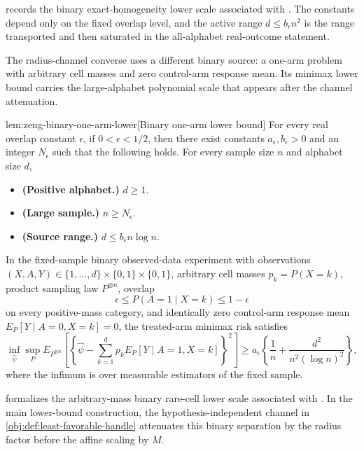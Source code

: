  records the binary exact-homogeneity lower scale associated with \citet{ZengBalakrishnanHanKennedy2024}. The constants depend only on the fixed overlap level, and the active range \(d\le b_\epsilon n^2\) is the range transported and then saturated in the all-alphabet real-outcome statement.

The radius-channel converse uses a different binary source: a one-arm problem with arbitrary cell masses and zero control-arm response mean. Its minimax lower bound carries the large-alphabet polynomial scale that appears after the channel attenuation.

\begin{lemmav}{lem:zeng-binary-one-arm-lower}[Binary one-arm lower bound]
For every real overlap constant \(\epsilon\), if \(0<\epsilon<1/2\), then there exist constants \(a_{\epsilon},b_{\epsilon}>0\) and an integer \(N_{\epsilon}\) such that the following holds.  For every sample size \(n\) and alphabet size \(d\),
\begin{itemize}
\item \textbf{(Positive alphabet.)} \(d\ge 1\).
\item \textbf{(Large sample.)} \(n\ge N_{\epsilon}\).
\item \textbf{(Source range.)} \(d\le b_{\epsilon}n\log n\).
\end{itemize}
In the fixed-sample binary observed-data experiment with observations \((X,A,Y)\in\{1,\ldots,d\}\times\{0,1\}\times\{0,1\}\), arbitrary cell masses \(p_k=P(X=k)\), product sampling law \(P^{\otimes n}\), overlap
\[
\epsilon\le P(A=1\mid X=k)\le 1-\epsilon
\]
on every positive-mass category, and identically zero control-arm response mean \(E_P[Y\mid A=0,X=k]=0\), the treated-arm minimax risk satisfies
\[
\inf_{\widehat\psi}
\sup_P
E_{P^{\otimes n}}\left[
\left\{\widehat\psi-\sum_{k=1}^d p_k E_P[Y\mid A=1,X=k]\right\}^2
\right]
\ge
a_{\epsilon}
\left\{
\frac{1}{n}
+
\frac{d^2}{n^2(\log n)^2}
\right\},
\]
where the infimum is over measurable estimators of the fixed sample.
\end{lemmav}

 formalizes the arbitrary-mass binary rare-cell lower scale associated with \citet{ZengBalakrishnanHanKennedy2024}. In the main lower-bound construction, the hypothesis-independent channel in \cref{obj:def:least-favorable-handle} attenuates this binary separation by the radius factor before the affine scaling by \(M\).

